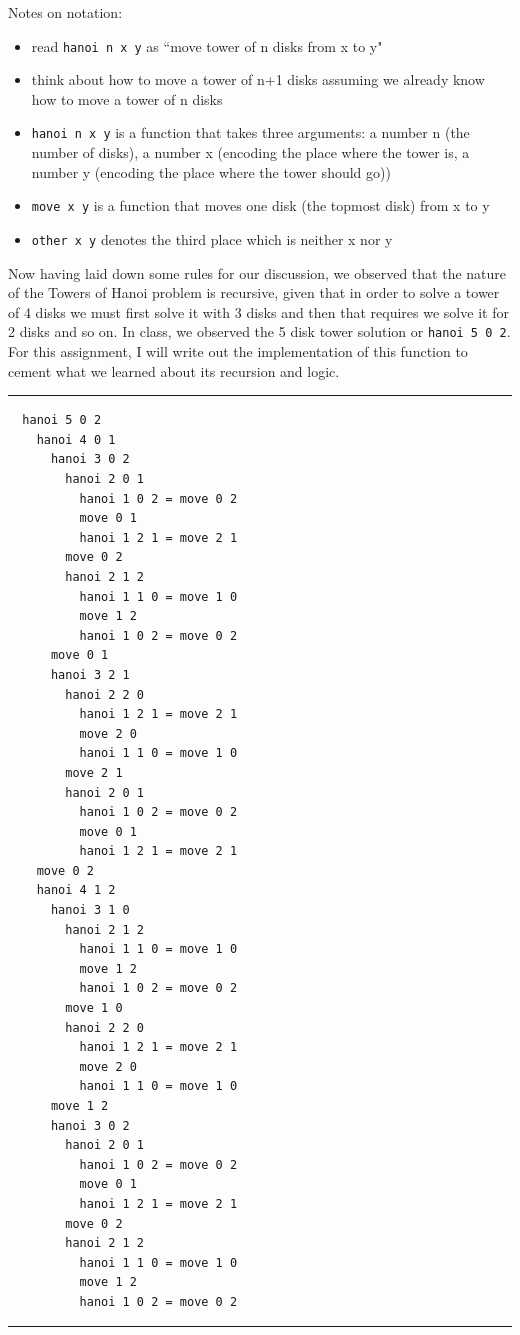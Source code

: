 \documentclass{article}
\theoremstyle{theorem}
\theoremstyle{definition}
\theoremstyle{remark}
\begin{document}
Notes on notation: 
\begin{itemize}
  \item read \texttt{hanoi n x y} as ``move tower of n disks from x to y"
  \item think about how to move a tower of n+1 disks assuming we already know how to move a tower of n disks 
  \item \texttt{hanoi n x y} is a function that takes three arguments: a number n (the number of disks), a number x (encoding the place where the tower is, a number y (encoding the place
  where the tower should go))
  \item \texttt{move x y} is a function that moves one disk (the topmost disk) from x to y 
  \item \texttt{other x y} denotes the third place which is neither x nor y 
\end{itemize}

Now having laid down some rules for our discussion, we observed that the nature of the Towers of Hanoi problem is recursive, given that in order to solve a tower of 4 disks we must first solve 
it with 3 disks and then that requires we solve it for 2 disks and so on. In class, we observed the 5 disk tower solution or \texttt{hanoi 5 0 2}. For this assignment, I will write out the 
implementation of this function to cement what we learned about its recursion and logic. \\

\noindent
  {\color{gray} \rule{\linewidth}{0.05mm}}
\begin{verbatim}
  hanoi 5 0 2
    hanoi 4 0 1
      hanoi 3 0 2
        hanoi 2 0 1
          hanoi 1 0 2 = move 0 2
          move 0 1
          hanoi 1 2 1 = move 2 1
        move 0 2
        hanoi 2 1 2 
          hanoi 1 1 0 = move 1 0 
          move 1 2
          hanoi 1 0 2 = move 0 2
      move 0 1
      hanoi 3 2 1 
        hanoi 2 2 0
          hanoi 1 2 1 = move 2 1 
          move 2 0
          hanoi 1 1 0 = move 1 0
        move 2 1
        hanoi 2 0 1
          hanoi 1 0 2 = move 0 2
          move 0 1
          hanoi 1 2 1 = move 2 1
    move 0 2
    hanoi 4 1 2
      hanoi 3 1 0
        hanoi 2 1 2
          hanoi 1 1 0 = move 1 0
          move 1 2
          hanoi 1 0 2 = move 0 2
        move 1 0
        hanoi 2 2 0
          hanoi 1 2 1 = move 2 1
          move 2 0
          hanoi 1 1 0 = move 1 0
      move 1 2
      hanoi 3 0 2
        hanoi 2 0 1
          hanoi 1 0 2 = move 0 2
          move 0 1
          hanoi 1 2 1 = move 2 1
        move 0 2
        hanoi 2 1 2
          hanoi 1 1 0 = move 1 0 
          move 1 2
          hanoi 1 0 2 = move 0 2
\end{verbatim}
\noindent
  {\color{gray} \rule{\linewidth}{0.05mm}}
\end{document}

